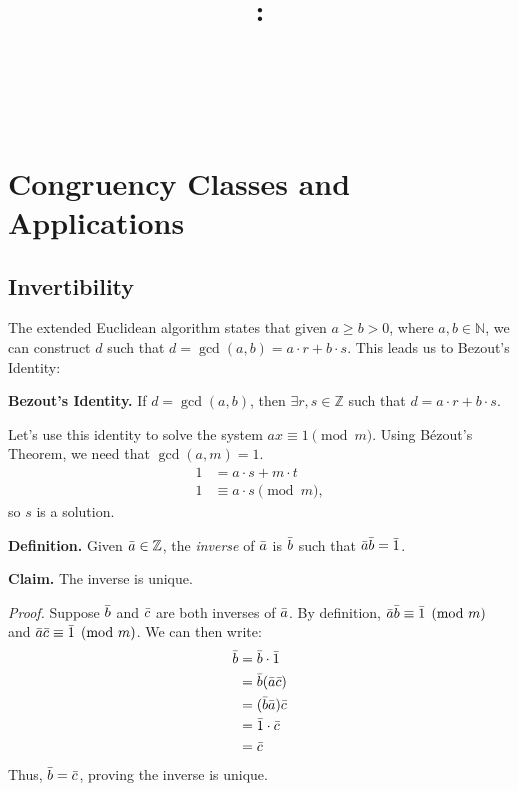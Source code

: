 \documentclass{article}
\title{
    \vspace{2in}
    \textbf{\lectClass:\\ \lectTitle}\\
    \vspace{0.1in}\large{\textit{\lectClassInstructor\ \lectSection}}
    \vspace{3in}
    \author{\textbf{\lectAuthorName}}
    \date{}
}
\begin{document}
\maketitle
\pagebreak

\section*{Congruency Classes and Applications}

\subsection*{Invertibility}
    The extended Euclidean algorithm states that given $a \ge b > 0$, where $a, b \in \mathbb{N}$, we can construct $d$ such that $d = \gcd(a, b) = a \cdot r + b \cdot s$. This leads us to Bezout's Identity:
    
    \vspace{1.5mm}
    \textbf{Bezout's Identity.} If $d = \gcd(a, b)$, then $\exists r, s \in \mathbb{Z}$ such that $d = a \cdot r + b \cdot s$.
    
    \vspace{1.5mm}
    Let's use this identity to solve the system $ax \equiv 1 \pmod{m}$. Using B\'ezout's Theorem, we need that $\gcd(a, m) = 1$.
    \begin{align*}
        1 &= a \cdot s + m \cdot t \\
        1 &\equiv a \cdot s \pmod{m},
    \end{align*}
    so $s$ is a solution.
    
    \vspace{1.5mm}
    \textbf{Definition.} Given $\Bar{a} \in \mathbb{Z}$, the \textit{inverse} of $\Bar{a}$ is $\Bar{b}$ such that $\Bar{a}\Bar{b} = \Bar{1}$.
    
    \vspace{1.5mm}
    \textbf{Claim.} The inverse is unique.
    
    \vspace{1.5mm}
    \textit{Proof.} Suppose $\Bar{b}$ and $\Bar{c}$ are both inverses of $\Bar{a}$. By definition, $\Bar{a}\Bar{b} \equiv \Bar{1} \pmod{m}$ and $\Bar{a}\Bar{c} \equiv \Bar{1} \pmod{m}$. We can then write:
    \begin{align*}
        \Bar{b} &= \Bar{b} \cdot \Bar{1} \\
        &= \Bar{b}(\Bar{a}\Bar{c}) \\
        &= (\Bar{b}\Bar{a})\Bar{c} \\
        &= \Bar{1} \cdot \Bar{c} \\
        &= \Bar{c}
    \end{align*}
    Thus, $\Bar{b} = \Bar{c}$, proving the inverse is unique.
\end{document}
